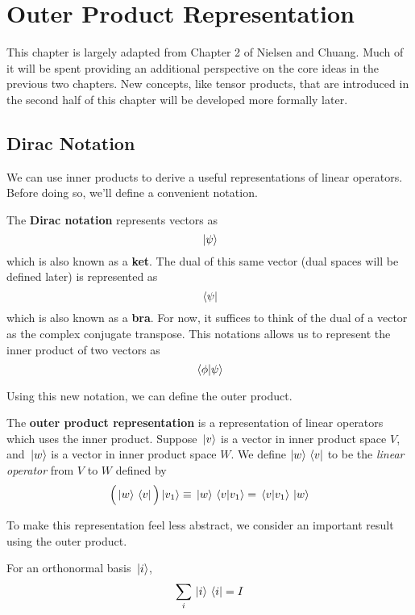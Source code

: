 \chapter{Outer Product Representation} 

This chapter is largely adapted from Chapter 2 of Nielsen and Chuang. Much of it will be spent providing an additional perspective on the core ideas in the previous two chapters. New concepts, like tensor products, that are introduced in the second half of this chapter will be developed more formally later. 

\section{Dirac Notation} 

We can use inner products to derive a useful representations of linear operators. Before doing so, we'll define a convenient notation. 

\begin{definition}
The \textbf{Dirac notation} represents vectors as 
$$\ket*{\psi}$$ which is also known as a \textbf{ket}. The dual of this same vector (dual spaces will be defined later) is represented as 
$$\bra*{\psi}$$ which is also known as a \textbf{bra}. For now, it suffices to think of the dual of a vector as the complex conjugate transpose. This notations allows us to represent the inner product of two vectors as 
$$\bra*{\phi}\ket*{\psi}$$
\end{definition}

Using this new notation, we can define the outer product. 

\begin{definition}
The \textbf{outer product representation} is a representation of linear operators which uses the inner product. Suppose $\ket*{v}$ is a vector in inner product space $V$, and $\ket*{w}$ is a vector in inner product space $W$. We define $\ket{w} \bra*{v}$ to be the \textit{linear operator} from $V$ to $W$ defined by 
$$\Big(\ket*{w} \bra*{v} \Big) \ket*{v_{1}} \equiv \ket*{w} \bra*{v} \ket*{v_{1}} = \bra*{v} \ket*{v_{1}} \ket*{w}$$
\end{definition}

To make this representation feel less abstract, we consider an important result using the outer product. 

\begin{lemma}
For an orthonormal basis $\ket*{i}$, 
$$\sum_{i} \ket*{i} \bra*{i} = I$$
\end{lemma}

